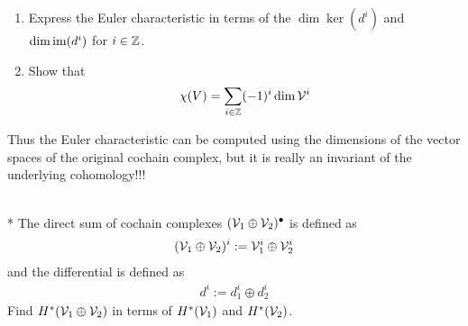 \begin{ques}$ $
  \begin{enumerate}
    \item Express the Euler characteristic in terms of the $ \dim \ker(d^i)$ and $ \dim \operatorname{im}(d^i)$ for $i \in \mathbb{Z}$.
    \item Show that
      \begin{align*}
        \chi(V) = \sum_{i \in \mathbb{Z}} (-1)^i \dim \mathcal{V}^i
      \end{align*}
  \end{enumerate}
  \end{ques}
  \noindent Thus the Euler characteristic can be computed using the dimensions of the vector spaces of the original cochain complex, but it is really an invariant of the underlying cohomology!!! \\\\
\begin{ques}*
  The direct sum of cochain complexes $(\mathcal{V}_1 \oplus \mathcal{V}_2)^\bullet$ is defined as
  \begin{align*}
    (\mathcal{V}_1 \oplus \mathcal{V}_2)^i := \mathcal{V}_1^i \oplus \mathcal{V}_2^i
  \end{align*}
  and the differential is defined as
  \begin{align*}
    d^i := d_1^i \oplus d_2^i
  \end{align*}
  Find $H^*(\mathcal{V}_1 \oplus \mathcal{V}_2)$ in terms of $H^*(\mathcal{V}_1)$ and $H^*(\mathcal{V}_2)$.
\end{ques}

